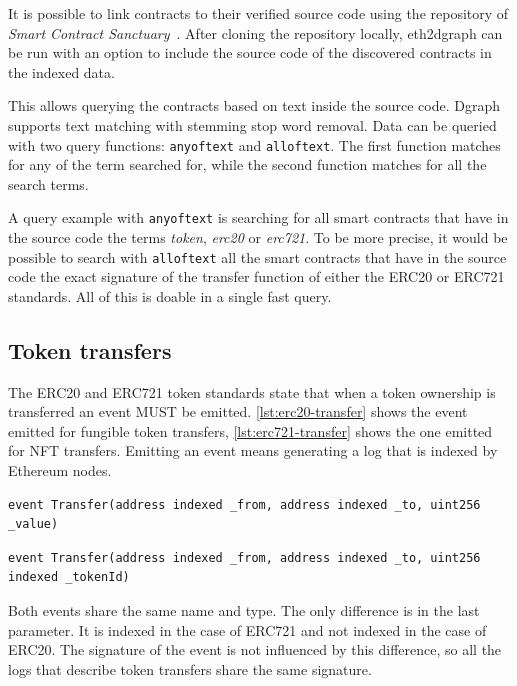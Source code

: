 It is possible to link contracts to their verified source code using the repository of \textit{Smart Contract Sanctuary}~\cite{smart_contract_sanctuary}. After cloning the repository locally, eth2dgraph can be run with an option to include the source code of the discovered contracts in the indexed data.

This allows querying the contracts based on text inside the source code. Dgraph supports text matching with stemming stop word removal. Data can be queried with two query functions: \texttt{anyoftext} and \texttt{alloftext}. The first function matches for any of the term searched for, while the second function matches for all the search terms.

A query example with {\tt anyoftext} is searching for all smart contracts that have in the source code the terms {\it token}, {\it erc20} or {\it erc721}. To be more precise, it would be possible to search with {\tt alloftext} all the smart contracts that have in the source code the exact signature of the transfer function of either the ERC20 or ERC721 standards. All of this is doable in a single fast query.

\subsection{Token transfers}

The ERC20 and ERC721 token standards state that when a token ownership is transferred an event MUST be emitted. \cref{lst:erc20-transfer} shows the event emitted for fungible token transfers, \cref{lst:erc721-transfer} shows the one emitted for NFT transfers. Emitting an event means generating a log that is indexed by Ethereum nodes.

\begin{lstlisting}[caption={Event emitted for ERC20 token transfer},label={lst:erc20-transfer},captionpos=b]
event Transfer(address indexed _from, address indexed _to, uint256 _value)
\end{lstlisting}

\begin{lstlisting}[caption={Event emitted for ERC721 token transfer},label={lst:erc721-transfer},captionpos=b]
event Transfer(address indexed _from, address indexed _to, uint256 indexed _tokenId)
\end{lstlisting}

Both events share the same name and type. The only difference is in the last parameter. It is indexed in the case of ERC721 and not indexed in the case of ERC20. The signature of the event is not influenced by this difference, so all the logs that describe token transfers share the same signature.

